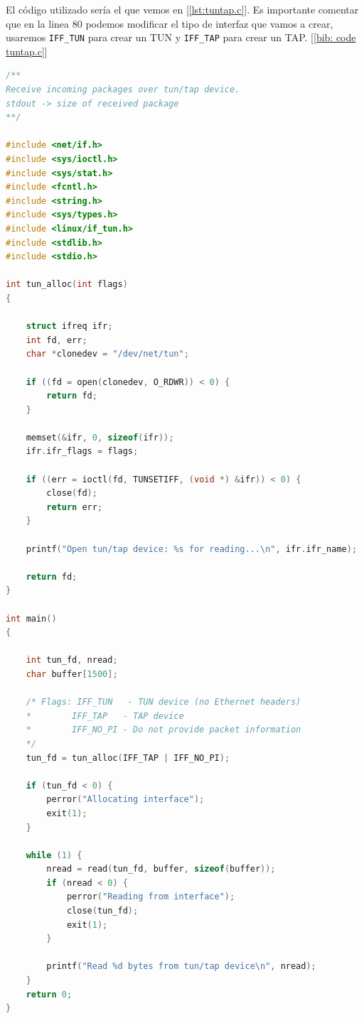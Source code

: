 \documentclass[a4paper, oneside, 12pt]{book}
\begin{document}
	\noindent El código utilizado sería el que vemos en [\ref{lst:tuntap.c}]. Es importante comentar que en la linea 80 podemos modificar el tipo de interfaz que vamos a crear, usaremos \texttt{IFF\_TUN} para crear un TUN y \texttt{IFF\_TAP} para crear un TAP. [\ref{bib: code tuntap.c}]
	\vspace{10px}
	\begin{lstlisting}[language=C, label=lst:tuntap.c, caption=Aplicación de ejemplo para crear tun/tap (\texttt{tuntap.c})]
/**
Receive incoming packages over tun/tap device. 
stdout -> size of received package
**/

#include <net/if.h>
#include <sys/ioctl.h>
#include <sys/stat.h>
#include <fcntl.h>
#include <string.h>
#include <sys/types.h>
#include <linux/if_tun.h>
#include <stdlib.h>
#include <stdio.h>

int tun_alloc(int flags)
{
	
	struct ifreq ifr;
	int fd, err;
	char *clonedev = "/dev/net/tun";
	
	if ((fd = open(clonedev, O_RDWR)) < 0) {
		return fd;
	}
	
	memset(&ifr, 0, sizeof(ifr));
	ifr.ifr_flags = flags;
	
	if ((err = ioctl(fd, TUNSETIFF, (void *) &ifr)) < 0) {
		close(fd);
		return err;
	}
	
	printf("Open tun/tap device: %s for reading...\n", ifr.ifr_name);
	
	return fd;
}

int main()
{
	
	int tun_fd, nread;
	char buffer[1500];
	
	/* Flags: IFF_TUN   - TUN device (no Ethernet headers)
	*        IFF_TAP   - TAP device
	*        IFF_NO_PI - Do not provide packet information
	*/
	tun_fd = tun_alloc(IFF_TAP | IFF_NO_PI);
	
	if (tun_fd < 0) {
		perror("Allocating interface");
		exit(1);
	}
	
	while (1) {
		nread = read(tun_fd, buffer, sizeof(buffer));
		if (nread < 0) {
			perror("Reading from interface");
			close(tun_fd);
			exit(1);
		}
		
		printf("Read %d bytes from tun/tap device\n", nread);
	}
	return 0;
}
	\end{lstlisting}

\end{document}
